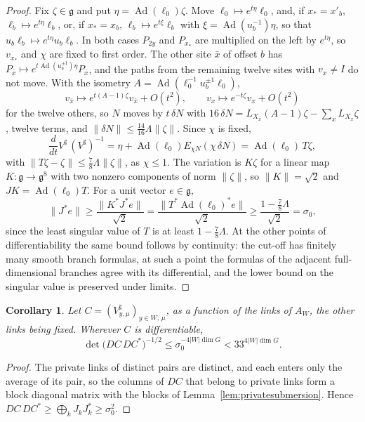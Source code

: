 \documentclass[11pt]{amsart}
\newtheorem{corollary}[theorem]{Corollary}
\theoremstyle{definition}
\theoremstyle{remark}
\numberwithin{equation}{section}
\newcommand{\g}{\mathfrak{g}}
\begin{document}
\begin{proof}
Fix $\zeta\in\g$ and put $\eta=\operatorname{Ad}(\ell_0)\zeta$. Move $\ell_0
\mapsto e^{t\eta}\ell_0$, and, if $x_*=x'_b$, $\ell_b\mapsto e^{t\eta}\ell_b$,
or, if $x_*=x_b$, $\ell_b\mapsto e^{t\xi}\ell_b$ with $\xi=\operatorname{Ad}
(u_b^{-1})\eta$, so that $u_b\ell_b\mapsto e^{t\eta}u_b\ell_b$. In both cases
$P_{2y}$ and $P_{x_*}$ are multiplied on the left by $e^{t\eta}$, so
$v_{x_*}$ and $\chi$ are fixed to first order. The other site $\bar x$ of
offset $b$ has $P_{\bar x}\mapsto e^{t\operatorname{Ad}(u_b^{\pm1})\eta}
P_{\bar x}$, and the paths from the remaining twelve sites with $v_x\ne I$
do not move. With the isometry $A=\operatorname{Ad}(\ell_0^{-1}u_b^{\pm1}
\ell_0)$,
\[
v_{\bar x}\mapsto e^{t(A-1)\zeta}v_{\bar x}+O(t^2),\qquad v_x\mapsto e^{-t
\zeta}v_x+O(t^2)
\]
for the twelve others, so $N$ moves by $t\,\delta N$ with $16\,\delta N=L_{X
_{\bar x}}(A-1)\zeta-\sum_xL_{X_x}\zeta$, twelve terms, and $\lVert\delta N
\rVert\le\frac{14}{16}\Lambda\lVert\zeta\rVert$. Since $\chi$ is fixed,
\[
\frac d{dt}V^\sharp\,(V^\sharp)^{-1}=\eta+\operatorname{Ad}(\ell_0)E_{\chi
N}(\chi\,\delta N)=\operatorname{Ad}(\ell_0)\,T\zeta,
\]
with $\lVert T\zeta-\zeta\rVert\le\frac78\Lambda\lVert\zeta\rVert$, as
$\chi\le1$. The variation is $K\zeta$ for a linear map $K:\g\to\g^8$ with two
nonzero components of norm $\lVert\zeta\rVert$, so $\lVert K\rVert=\sqrt2$
and $JK=\operatorname{Ad}(\ell_0)T$. For a unit vector $e\in\g$,
\[
\lVert J^*e\rVert\ge\frac{\lVert K^*J^*e\rVert}{\sqrt2}=\frac{\lVert T^*
\operatorname{Ad}(\ell_0)^*e\rVert}{\sqrt2}\ge\frac{1-\frac78\Lambda}
{\sqrt2}=\sigma_0,
\]
since the least singular value of $T$ is at least $1-\frac78\Lambda$.
At the other points of differentiability the same bound follows by
continuity: the cut-off has finitely many smooth branch formulas, at such a
point the formulas of the adjacent full-dimensional branches agree with its
differential, and the lower bound on the singular value is preserved under
limits.
\end{proof}

\begin{corollary}\label{cor:coareabound}
Let $C=(V^\sharp_{y,\mu})_{y\in W,\,\mu}$, as a function of the links of
$A_W$, the other links being fixed. Wherever $C$ is differentiable,
\[
\det\bigl(DC\,DC^*\bigr)^{-1/2}\le\sigma_0^{-4|W|\dim G}<33^{4|W|\dim G}.
\]
\end{corollary}

\begin{proof}
The private links of distinct pairs are distinct, and each enters only the
average of its pair, so the columns of $DC$ that belong to private links
form a block diagonal matrix with the blocks of
Lemma~\ref{lem:privatesubmersion}. Hence $DC\,DC^*\ge\bigoplus_kJ_kJ_k^*
\ge\sigma_0^2$.
\end{proof}
\end{document}

